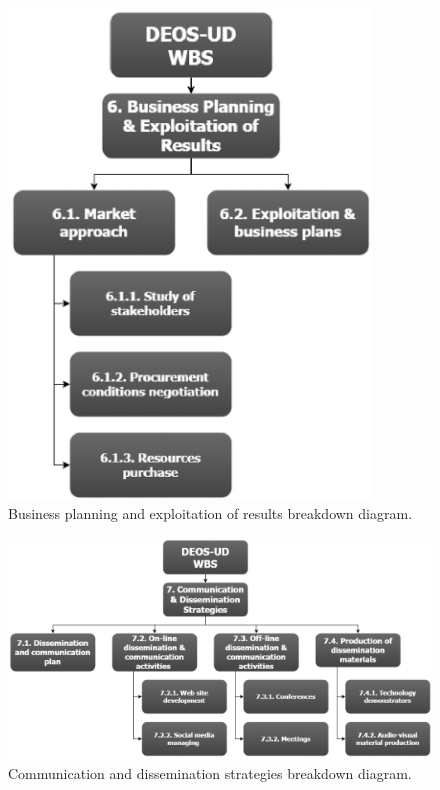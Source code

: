 \vspace*{\fill}
\begin{figure}[H]
	\centering
	\includegraphics[height=13cm,keepaspectratio]{./sections/2.WBS/WBS_Section6}
	\caption[Business planning and exploitation of results breakdown diagram]{Business planning and exploitation of results breakdown diagram.}
	\label{fig:WBS_Section6}
\end{figure}
\vspace*{\fill}

\begin{landscape}\tiny

\vspace*{\fill}
\begin{figure}[H]
	\centering
	\includegraphics[width=1.3\textwidth]{./sections/2.WBS/WBS_Section7}
	\caption[Communication and dissemination strategies breakdown diagram]{Communication and dissemination strategies breakdown diagram.}
	\label{fig:WBS_Section7}
\end{figure}
\vspace*{\fill}

\end{landscape}



